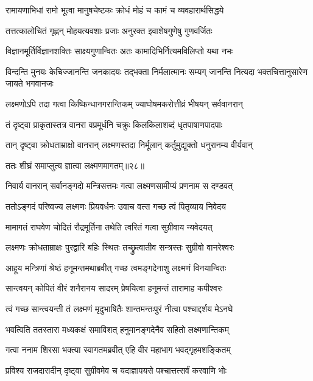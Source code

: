 \twolineshloka
{रामायणाभिधां रामो भूत्वा मानुषचेष्टकः}
{क्रोधं मोहं च कामं च व्यवहारार्थसिद्धये} %

\twolineshloka
{तत्तत्कालोचितं गृह्णन् मोहयत्यवशाः प्रजाः}
{अनुरक्त इवाशेषगुणेषु गुणवर्जितः} %

\twolineshloka
{विज्ञानमूर्तिर्विज्ञानशक्तिः साक्ष्यगुणान्वितः}
{अतः कामादिभिर्नित्यमविलिप्तो यथा नभः} %

\threelineshloka
{विन्दन्ति मुनयः केचिज्जानन्ति जनकादयः}
{तद्भक्ता निर्मलात्मानः सम्यग् जानन्ति नित्यदा}
{भक्तचित्तानुसारेण जायते भगवानजः} %

\twolineshloka
{लक्ष्मणोऽपि तदा गत्वा किष्किन्धानगरान्तिकम्}
{ज्याघोषमकरोत्तीव्रं भीषयन् सर्ववानरान्} %

\twolineshloka
{तं दृष्ट्वा प्राकृतास्तत्र वानरा वप्रमूर्धनि}
{चक्रुः किलकिलाशब्दं धृतपाषाणपादपाः} %

\twolineshloka
{तान् दृष्ट्वा क्रोधताम्राक्षो वानरान् लक्ष्मणस्तदा}
{निर्मूलान् कर्तुमुद्युक्तो धनुरानम्य वीर्यवान्} %

{ततः शीघ्रं समाप्लुत्य ज्ञात्वा लक्ष्मणमागतम्॥२८॥} %


\twolineshloka
{निवार्य वानरान् सर्वानङ्गदो मन्त्रिसत्तमः}
{गत्वा लक्ष्मणसामीप्यं प्रणनाम स दण्डवत्} %

\twolineshloka
{ततोऽङ्गदं परिष्वज्य लक्ष्मणः प्रियवर्धनः}
{उवाच वत्स गच्छ त्वं पितृव्याय निवेदय} %

\twolineshloka
{मामागतं राघवेण चोदितं रौद्रमूर्तिना}
{तथेति त्वरितं गत्वा सुग्रीवाय न्यवेदयत्} %

\twolineshloka
{लक्ष्मणः क्रोधताम्राक्षः पुरद्वारि बहिः स्थितः}
{तच्छ्रुत्वातीव सन्त्रस्तः सुग्रीवो वानरेश्वरः} %

\twolineshloka
{आहूय मन्त्रिणां श्रेष्ठं हनूमन्तमथाब्रवीत्}
{गच्छ त्वमङ्गदेनाशु लक्ष्मणं विनयान्वितः} %

\twolineshloka
{सान्त्वयन् कोपितं वीरं शनैरानय सादरम्}
{प्रेषयित्वा हनूमन्तं तारामाह कपीश्वरः} %

\twolineshloka
{त्वं गच्छ सान्त्वयन्ती तं लक्ष्मणं मृदुभाषितैः}
{शान्तमन्तःपुरं नीत्वा पश्चाद्दर्शय मेऽनघे} %

\twolineshloka
{भवत्विति ततस्तारा मध्यकक्षं समाविशत्}
{हनुमानङ्गदेनैव सहितो लक्ष्मणान्तिकम्} %

\twolineshloka
{गत्वा ननाम शिरसा भक्त्या स्वागतमब्रवीत्}
{एहि वीर महाभाग भवद्गृहमशङ्कितम्} %

\twolineshloka
{प्रविश्य राजदारादीन् दृष्ट्वा सुग्रीवमेव च}
{यदाज्ञापयसे पश्चात्तत्सर्वं करवाणि भोः} %

